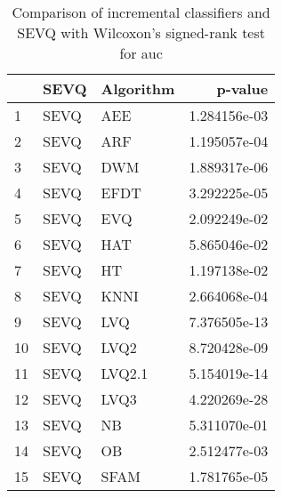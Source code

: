 \begin{table}[H]
\footnotesize
\centering
\caption{Comparison of incremental classifiers and SEVQ with Wilcoxon’s signed-rank test for auc}
\label{tab:Incremental wilcoxon AUC comparison}
\begin{tabular}{lllr}
\hline
{} &  SEVQ & Algorithm &       p-value \\
\hline
1  &  SEVQ &       AEE &  1.284156e-03 \\
2  &  SEVQ &       ARF &  1.195057e-04 \\
3  &  SEVQ &       DWM &  1.889317e-06 \\
4  &  SEVQ &      EFDT &  3.292225e-05 \\
5  &  SEVQ &       EVQ &  2.092249e-02 \\
6  &  SEVQ &       HAT &  5.865046e-02 \\
7  &  SEVQ &        HT &  1.197138e-02 \\
8  &  SEVQ &      KNNI &  2.664068e-04 \\
9  &  SEVQ &       LVQ &  7.376505e-13 \\
10 &  SEVQ &      LVQ2 &  8.720428e-09 \\
11 &  SEVQ &    LVQ2.1 &  5.154019e-14 \\
12 &  SEVQ &      LVQ3 &  4.220269e-28 \\
13 &  SEVQ &        NB &  5.311070e-01 \\
14 &  SEVQ &        OB &  2.512477e-03 \\
15 &  SEVQ &      SFAM &  1.781765e-05 \\
\hline
\end{tabular}
\end{table}
